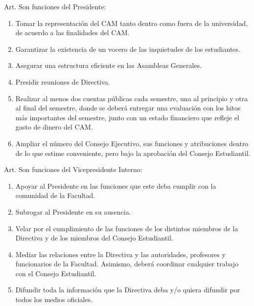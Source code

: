 \documentclass[letterpaper,11pt]{article}
\newcounter{art}
\newenvironment{art}{
    Art.\refstepcounter{art} \theart\:
}{}
\begin{document}
\begin{art}\label{funcionesPresidente}
    Son funciones del Presidente:
    \begin{enumerate}
        \item Tomar la representación del CAM tanto dentro como fuera de la universidad, de acuerdo a las finalidades del CAM.
        \item Garantizar la existencia de un vocero de las inquietudes de los estudiantes.
        \item Asegurar una estructura eficiente en las Asambleas Generales.
        \item Presidir reuniones de Directiva.
        \item Realizar al menos dos cuentas públicas cada semestre, una al principio y otra al final del semestre, donde se deberá entregar una evaluación con los hitos más importantes del semestre, junto con un estado financiero que refleje el gasto de dinero del CAM.
        \item Ampliar el número del Consejo Ejecutivo, sus funciones y atribuciones dentro de lo que estime conveniente, pero bajo la aprobación del Consejo Estudiantil.
    \end{enumerate}
\end{art}

\begin{art}\label{funcionesVicepresidenteInterno}
    Son funciones del Vicepresidente Interno:
    \begin{enumerate}
        \item Apoyar al Presidente en las funciones que este deba cumplir con la comunidad de la Facultad.
        \item Subrogar al Presidente en su ausencia.
        \item Velar por el cumplimiento de las funciones de los distintos miembros de la Directiva y de los miembros del Consejo Estudiantil.
        \item Mediar las relaciones entre la Directiva y las autoridades, profesores y funcionarios de la Facultad. Asimismo, deberá coordinar cualquier trabajo con el Consejo Estudiantil.
        \item Difundir toda la información que la Directiva deba y/o quiera difundir por todos los medios oficiales.
    \end{enumerate}
\end{art}
\end{document}
